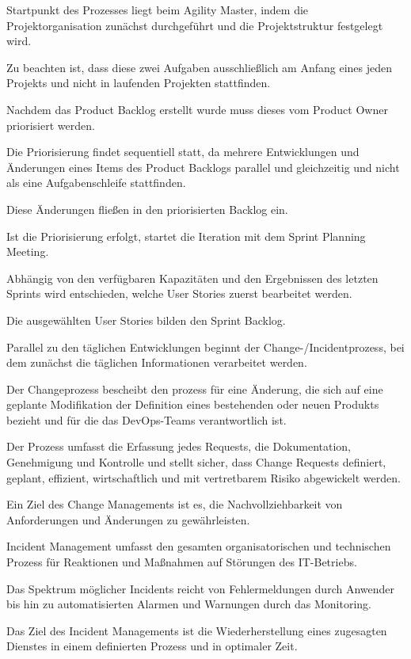 \newpage Startpunkt des Prozesses liegt beim Agility Master, indem die Projektorganisation zunächst durchgeführt und die Projektstruktur festgelegt wird.

Zu beachten ist, dass diese zwei Aufgaben ausschließlich am Anfang eines jeden Projekts und nicht in laufenden Projekten stattfinden. 

Nachdem das Product Backlog erstellt wurde muss dieses vom Product Owner priorisiert werden. 

Die Priorisierung findet sequentiell statt, da mehrere Entwicklungen und Änderungen eines Items des Product Backlogs parallel und gleichzeitig und nicht als eine Aufgabenschleife stattfinden. 

Diese Änderungen fließen in den priorisierten Backlog ein. 

Ist die Priorisierung erfolgt, startet die Iteration mit dem Sprint Planning Meeting. 

Abhängig von den verfügbaren Kapazitäten und den Ergebnissen des letzten Sprints wird entschieden, welche User Stories zuerst bearbeitet werden. 

Die ausgewählten User Stories bilden den Sprint Backlog. 

Parallel zu den täglichen Entwicklungen beginnt der Change-/Incidentprozess, bei dem zunächst die täglichen Informationen verarbeitet werden. 

Der Changeprozess bescheibt den prozess für eine Änderung, die sich auf eine geplante Modifikation der Definition eines bestehenden oder neuen Produkts bezieht und für die das DevOps-Teams verantwortlich ist. 

Der Prozess umfasst die Erfassung jedes Requests, die Dokumentation, Genehmigung und Kontrolle und stellt sicher, dass Change Requests definiert, geplant, effizient, wirtschaftlich und mit vertretbarem Risiko abgewickelt werden. 

Ein Ziel des Change Managements ist es, die Nachvollziehbarkeit von Anforderungen und Änderungen zu gewährleisten.

Incident Management umfasst den gesamten organisatorischen und technischen Prozess für Reaktionen und Maßnahmen auf Störungen des IT-Betriebs.

Das Spektrum möglicher Incidents reicht von Fehlermeldungen durch Anwender bis hin zu automatisierten Alarmen und Warnungen durch das Monitoring.

Das Ziel des Incident Managements ist die Wiederherstellung eines zugesagten Dienstes in einem definierten Prozess und in optimaler Zeit. 

